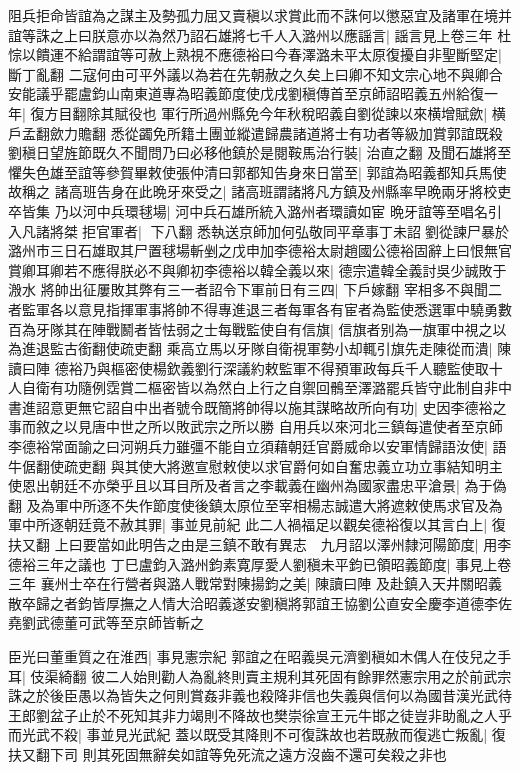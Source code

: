 阻兵拒命皆誼為之謀主及勢孤力屈又賣稹以求賞此而不誅何以懲惡宜及諸軍在境并誼等誅之上曰朕意亦以為然乃詔石雄將七千人入潞州以應謡言|{
	謡言見上卷三年}
杜悰以饋運不給謂誼等可赦上熟視不應德裕曰今春澤潞未平太原復擾自非聖斷堅定|{
	斷丁亂翻}
二寇何由可平外議以為若在先朝赦之久矣上曰卿不知文宗心地不與卿合安能議乎罷盧鈞山南東道專為昭義節度使戊戌劉稹傳首至京師詔昭義五州給復一年|{
	復方目翻除其賦役也}
軍行所過州縣免今年秋稅昭義自劉從諫以來横增賦歛|{
	横戶孟翻歛力贍翻}
悉從蠲免所籍土團並縱遣歸農諸道將士有功者等級加賞郭誼既殺劉稹日望旌節既久不聞問乃曰必移他鎮於是閱鞍馬治行裝|{
	治直之翻}
及聞石雄將至懼失色雄至誼等參賀畢敕使張仲清曰郭都知告身來日當至|{
	郭誼為昭義都知兵馬使故稱之}
諸高班告身在此晩牙來受之|{
	諸高班謂諸將凡方鎮及州縣率早晩兩牙將校吏卒皆集}
乃以河中兵環毬場|{
	河中兵石雄所統入潞州者環讀如宦}
晩牙誼等至唱名引入凡諸將桀拒官軍者|{
	下八翻}
悉執送京師加何弘敬同平章事丁未詔劉從諫尸暴於潞州市三日石雄取其尸置毬場斬剉之戊申加李德裕太尉趙國公德裕固辭上曰恨無官賞卿耳卿若不應得朕必不與卿初李德裕以韓全義以來|{
	德宗遣韓全義討吳少誠敗于溵水}
將帥出征屢敗其弊有三一者詔令下軍前日有三四|{
	下戶嫁翻}
宰相多不與聞二者監軍各以意見指揮軍事將帥不得專進退三者每軍各有宦者為監使悉選軍中驍勇數百為牙隊其在陣戰鬭者皆怯弱之士每戰監使自有信旗|{
	信旗者别為一旗軍中視之以為進退監古銜翻使疏吏翻}
乘高立馬以牙隊自衛視軍勢小却輒引旗先走陳從而潰|{
	陳讀曰陣}
德裕乃與樞密使楊欽義劉行深議約敕監軍不得預軍政每兵千人聽監使取十人自衛有功隨例霑賞二樞密皆以為然白上行之自禦回鶻至澤潞罷兵皆守此制自非中書進詔意更無它詔自中出者號令既簡將帥得以施其謀略故所向有功|{
	史因李德裕之事而敘之以見唐中世之所以敗武宗之所以勝}
自用兵以來河北三鎮每遣使者至京師李德裕常面諭之曰河朔兵力雖彊不能自立須藉朝廷官爵威命以安軍情歸語汝使|{
	語牛倨翻使疏吏翻}
與其使大將邀宣慰敕使以求官爵何如自奮忠義立功立事結知明主使恩出朝廷不亦榮乎且以耳目所及者言之李載義在幽州為國家盡忠平滄景|{
	為于偽翻}
及為軍中所逐不失作節度使後鎮太原位至宰相楊志誠遣大將遮敕使馬求官及為軍中所逐朝廷竟不赦其罪|{
	事並見前紀}
此二人禍福足以觀矣德裕復以其言白上|{
	復扶又翻}
上曰要當如此明告之由是三鎮不敢有異志　九月詔以澤州隸河陽節度|{
	用李德裕三年之議也}
丁巳盧鈞入潞州鈞素寛厚愛人劉稹未平鈞已領昭義節度|{
	事見上卷三年}
襄州士卒在行營者與潞人戰常對陳揚鈞之美|{
	陳讀曰陣}
及赴鎮入天井關昭義散卒歸之者鈞皆厚撫之人情大洽昭義遂安劉稹將郭誼王協劉公直安全慶李道德李佐堯劉武德董可武等至京師皆斬之

臣光曰董重質之在淮西|{
	事見憲宗紀}
郭誼之在昭義吳元濟劉稹如木偶人在伎兒之手耳|{
	伎渠綺翻}
彼二人始則勸人為亂終則賣主規利其死固有餘罪然憲宗用之於前武宗誅之於後臣愚以為皆失之何則賞姦非義也殺降非信也失義與信何以為國昔漢光武待王郎劉盆子止於不死知其非力竭則不降故也樊崇徐宣王元牛邯之徒豈非助亂之人乎而光武不殺|{
	事並見光武紀}
蓋以既受其降則不可復誅故也若既赦而復逃亡叛亂|{
	復扶又翻下司}
則其死固無辭矣如誼等免死流之遠方沒齒不還可矣殺之非也

